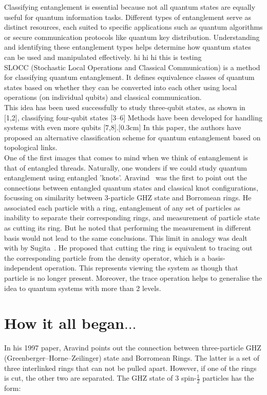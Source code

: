 \documentclass{scrartcl}
\begin{document}
Classifying entanglement is essential because not all quantum states are equally useful for quantum information tasks. Different types of entanglement serve as distinct resources, each suited to specific applications such as quantum algorithms or secure communication protocols like quantum key distribution. Understanding and identifying these entanglement types helps determine how quantum states can be used and manipulated effectively. hi hi hi this is testing\\[0.3cm]
SLOCC (Stochastic Local Operations and Classical Communication) is a method for classifying quantum entanglement. It defines equivalence classes of quantum states based on whether they can be converted into each other using local operations (on individual qubits) and classical communication.\\[0.3cm]
This idea has been used successfully to study three-qubit states, as shown in [1,2], classifying four-qubit states [3–6] Methods have been developed for handling systems with even more qubits [7,8].[0.3cm]
In this paper, the authors have proposed an alternative classification scheme for quantum entanglement based on topological links.\\[0.3cm]
One of the first images that comes to mind when we think of entanglement is that of entangled threads. Naturally, one wonders if we could study quantum entanglement using entangled 'knots'. Aravind~\cite{Aravind1997} was the first to point out the connections between entangled quantum states and classical knot configurations, focussing on similarity between 3-particle GHZ state and Borromean rings. He associated each particle with a ring, entanglement of any set of particles as inability to separate their corresponding rings, and measurement of particle state as cutting its ring. But he noted that performing the measurement in different basis would not lead to the same conclusions. This limit in analogy was dealt with by Sugita~\cite{Sugita2007-ko}. He proposed that cutting the ring is equivalent to tracing out the corresponding particle from the density operator, which is a basis-independent operation. This represents viewing the system as though that particle is no longer present. Moreover, the trace operation helps to generalise the idea to quantum systems with more than 2 levels.  

\section{How it all began$\ldots$}
In his 1997 paper, Aravind points out the connection between three-particle GHZ (Greenberger–Horne–Zeilinger)
state and Borromean Rings. The latter is a set of three interlinked rings that can not be pulled apart. However, if one of the rings is cut, the other two are separated. The GHZ state of 3 spin-$\frac{1}{2}$ particles has the form:
\end{document}
